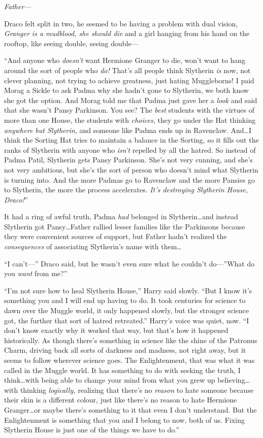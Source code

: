 \emph{Father—}

Draco felt split in two, he seemed to be having a problem with dual vision, \emph{Granger is a mudblood, she should die} and a girl hanging from his hand on the rooftop, like seeing double, seeing double—

“And anyone who \emph{doesn’t} want Hermione Granger to die, won’t want to hang around the sort of people who \emph{do!} That’s all people think Slytherin \emph{is} now, not clever planning, not trying to achieve greatness, just hating Muggleborns! I paid Morag a Sickle to ask Padma why she hadn’t gone to Slytherin, we both know she got the option. And Morag told me that Padma just gave her a \emph{look} and said that she wasn’t Pansy Parkinson. You see? The \emph{best} students with the virtues of more than one House, the students with \emph{choices,} they go under the Hat thinking \emph{anywhere but Slytherin,} and someone like Padma ends up in Ravenclaw. And…I think the Sorting Hat tries to maintain a balance in the Sorting, so it fills out the ranks of Slytherin with anyone who \emph{isn’t} repelled by all the hatred. So instead of Padma Patil, Slytherin gets Pansy Parkinson. She’s not very cunning, and she’s not very ambitious, but she’s the sort of person who doesn’t mind what Slytherin is turning into. And the more Padmas go to Ravenclaw and the more Pansies go to Slytherin, the more the process accelerates. \emph{It’s destroying Slytherin House, Draco!}”

It had a ring of awful truth, Padma \emph{had} belonged in Slytherin…and instead Slytherin got Pansy…Father rallied lesser families like the Parkinsons because they were convenient sources of support, but Father hadn’t realized the \emph{consequences} of associating Slytherin’s name with them…

“I can’t—” Draco said, but he wasn’t even sure what he couldn’t do—”What do you \emph{want} from me?”

“I’m not sure how to heal Slytherin House,” Harry said slowly. “But I know it’s something you and I will end up having to do. It took centuries for science to dawn over the Muggle world, it only happened slowly, but the stronger science got, the further that sort of hatred retreated.” Harry’s voice was quiet, now. “I don’t know exactly why it worked that way, but that’s how it happened historically. As though there’s something in science like the shine of the Patronus Charm, driving back all sorts of darkness and madness, not right away, but it seems to follow wherever science goes. The Enlightenment, that was what it was called in the Muggle world. It has something to do with seeking the truth, I think…with being able to change your mind from what you grew up believing…with thinking \emph{logically,} realizing that there’s no \emph{reason} to hate someone because their skin is a different colour, just like there’s no reason to hate Hermione Granger…or maybe there’s something to it that even I don’t understand. But the Enlightenment is something that you and I belong to now, both of us. Fixing Slytherin House is just one of the things we have to do.”

